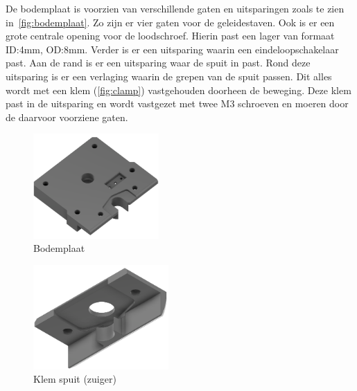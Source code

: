 De bodemplaat is voorzien van verschillende gaten en uitsparingen zoals te zien in\ \autoref{fig:bodemplaat}. Zo zijn er vier gaten voor de geleidestaven. Ook is er een grote centrale opening voor de loodschroef. Hierin past een lager van formaat ID:4mm, OD:8mm. Verder is er een uitsparing waarin een eindeloopschakelaar past. Aan de rand is er een uitsparing waar de spuit in past. Rond deze uitsparing is er een verlaging waarin de grepen van de spuit passen. Dit alles wordt met een klem (\autoref{fig:clamp}) vastgehouden doorheen de beweging. Deze klem past in de uitsparing en wordt vastgezet met twee M3 schroeven en moeren door de daarvoor voorziene gaten.
\\[12pt]\begin{minipage}[t]{0.49\textwidth}
    \vspace{0pt}
    \begin{figure}[H]
        \centering
        \includegraphics[height=4cm]{figures/Foundation_1_w.png}
        \caption{Bodemplaat}\label{fig:bodemplaat}
    \end{figure}
\end{minipage}
\begin{minipage}[t]{0.49\textwidth}
    \vspace{0pt}
    \begin{figure}[H]
        \centering
        \includegraphics[height=4cm]{figures/Foundation_clamp_w.png}
        \caption{Klem spuit (zuiger)}\label{fig:clamp}
    \end{figure}
\end{minipage}\\

